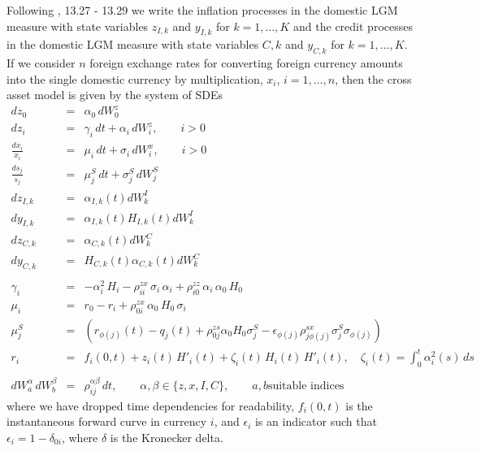 \documentclass[12pt, a4paper]{article}
\begin{document}
{\begin{appendix}
Following \cite{Lichters}, 13.27 - 13.29 we write the inflation processes 
in the domestic LGM measure with state variables $z_{I,k}$ and $y_{I,k}$ for $k=1,\ldots,K$
and the credit processes in the domestic LGM measure with state variables ${C,k}$ and $y_{C,k}$ for $k=1,\ldots,K$.
If we consider $n$ 
foreign exchange rates for converting foreign currency amounts into the single domestic currency by multiplication, 
$x_i$, $i=1,\dots,n$, then the cross asset model is given by the system of SDEs
\begin{eqnarray*}
dz_0 &=& \alpha_0\,dW_0^z \\
dz_i &=& \gamma_i\,dt + \alpha_i\,dW_i^z,  \qquad i>0 \\
\frac{d x_i}{x_i} &=& \mu_i\, dt + \sigma_i\,dW_i^x, \qquad i > 0 \\
\frac{d s_j}{s_j} &=& \mu_j^S\, dt + \sigma_j^S\,dW_j^S \\
dz_{I,k} &=& \alpha_{I,k}(t)dW_k^I \\
dy_{I,k} &=& \alpha_{I,k}(t)H_{I,k}(t)dW_k^I \\
dz_{C,k} &=& \alpha_{C,k}(t)dW_k^C \\
dy_{C,k} &=& H_{C,k}(t)\alpha_{C,k}(t)dW_k^C \\ \\
\gamma_i &=&
-\alpha_i^2\,H_i -\rho_{ii}^{zx}\,\sigma_i\,\alpha_i + \rho_{i0}^{zz}\,\alpha_i\,\alpha_0\,H_0\\
\mu_i &=& r_0 - r_i + \rho_{0i}^{zx}\,\alpha_0\,H_0\,\sigma_i\\
\mu_j^S &=& (r_{\phi(j)}(t) - q_j(t) + \rho_{0j}^{zs} \alpha_0 H_0 \sigma_j^S - \epsilon_{\phi(j)}
\rho_{j \phi(j)}^{sx}\sigma_j^S \sigma_{\phi(j)}) \\
r_i &=& f_i(0,t) + z_i(t)\,H'_i(t) + \zeta_i(t)\,H_i(t)\,H'_i(t),
\quad \zeta_i(t) = \int_0^t \alpha_i^2(s)\,ds  \\ \\
dW^\alpha_a\,dW^\beta_b &=& \rho^{\alpha\beta}_{ij}\,dt, \qquad \alpha, \beta \in \{z, x, I, C\}, \qquad a, b \text{
                              suitable indices }
\end{eqnarray*}
where we have dropped time dependencies for readability, $f_i(0,t)$ is the instantaneous forward curve in currency $i$, 
and $\epsilon_i$ is an indicator such that $\epsilon_i = 1 - \delta_{0i}$, where $\delta$ is the Kronecker delta.


\end{appendix}}
\end{document}

